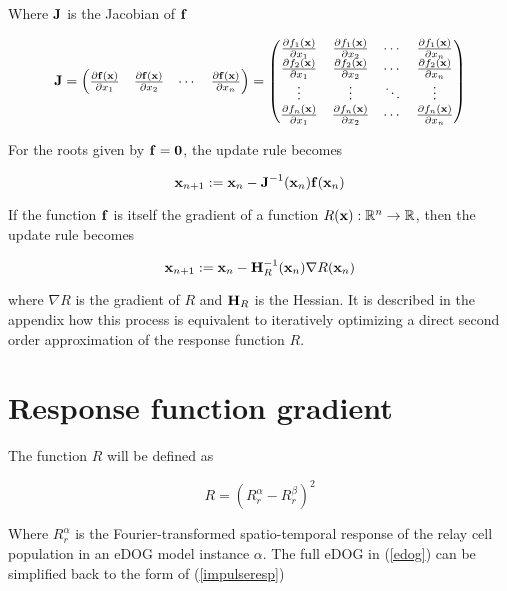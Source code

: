 \documentclass{article}
\newcommand{\R}{\mathbb{R}}
\newcommand{\vect}[1]{\textbf{\textrm{#1}}}
\newcommand{\pd}[2]{\frac{\partial {#1}}{\partial {#2}}}
\begin{document}
Where $\vect{J}$ is the Jacobian of $\vect{f}$

\begin{equation*}
	\vect{J} = 
	\begin{pmatrix}
		\pd{\vect{f}(\vect{x})}{x_1} & \pd{\vect{f}(\vect{x})}{x_2} & \cdots 
		& \pd{\vect{f}(\vect{x})}{x_n}
	\end{pmatrix} = 
	\begin{pmatrix}
		\pd{f_1(\vect{x})}{x_1} & \pd{f_1(\vect{x})}{x_2} & \cdots & \pd{f_1(\vect{x})}{x_n} \\
		\pd{f_2(\vect{x})}{x_1} & \pd{f_2(\vect{x})}{x_2} & \cdots & \pd{f_2(\vect{x})}{x_n} \\
		\vdots & \vdots & \ddots & \vdots \\
		\pd{f_n(\vect{x})}{x_1} & \pd{f_n(\vect{x})}{x_2} & \cdots & \pd{f_n(\vect{x})}{x_n}
	\end{pmatrix}
\end{equation*}

For the roots given by $\vect{f} = \vect{0}$, the update rule becomes

\begin{equation} \label{updaterule}
	\vect{x}_{n+1} := \vect{x}_n - \vect{J}^{-1}(\vect{x}_n)\vect{f}(\vect{x}_n)	
\end{equation}

If the function $\vect{f}$ is itself the gradient of a function $R(\vect{x}): \R^n \rightarrow \R$, then the update rule becomes

\begin{equation} \label{updateruledog}
	\vect{x}_{n+1} := \vect{x}_n - \vect{H}_R^{-1}(\vect{x}_n)\nabla R(\vect{x}_n)
\end{equation}

where $\nabla R$ is the gradient of $R$ and $\vect{H}_R$ is the Hessian.
It is described in the appendix how this process is equivalent to iteratively optimizing a direct second order approximation of the response function $R$.


\section{Response function gradient} \label{responsegradient}
The function $R$ will be defined as

\begin{equation}
	R = (R_{r}^{\alpha} - R_{r}^{\beta})^2
\end{equation}

Where $R_{r}^{\alpha}$ is the Fourier-transformed spatio-temporal response of the relay cell population in an eDOG model instance $\alpha$. 
The full eDOG in (\ref{edog}) can be simplified back to the form of (\ref{impulseresp})
\end{document}
